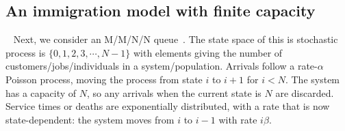 {%
\subsection{An immigration model with finite capacity}\label{sec:immig}~
Next, we consider an M/M/N/N queue~\citep{gross2011fundamentals}. The state space of this is stochastic 
process is $\{0, 1, 2, 3, \cdots, N - 1\}$ with 
elements giving the number of customers/jobs/individuals in a system/population. 
Arrivals follow a rate-$\alpha$ Poisson process, moving the process from state 
$i$ to $i+1$ for $i<N$. The system has a capacity of $N$, so any arrivals when 
the current state is $N$ are discarded.  Service times or deaths are 
exponentially distributed, with a rate that is now state-dependent:
the system moves from $i$ to $i - 1$ with rate $i\beta$. 

}
